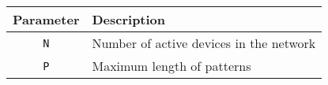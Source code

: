 \begin{table}[H]
    \caption{}
    \label{tab:parameters}
    \centering
    \begin{tabular}{|c|l|}
    \hline
    \textbf{Parameter} & \textbf{Description}             \\ \hline
    \texttt{N}         & Number of active devices in the network \\ \hline
    \texttt{P}         & Maximum length of patterns       \\ \hline
    \end{tabular}
\end{table}